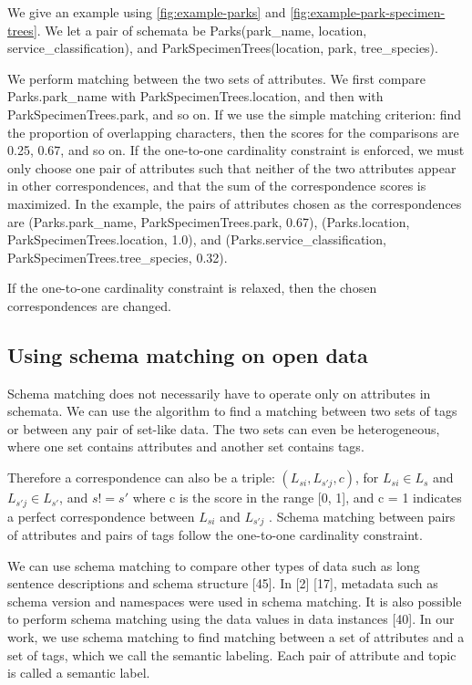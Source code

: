 We give an example using \autoref{fig:example-parks} and \autoref{fig:example-park-specimen-trees}. We let a pair of schemata be
Parks(park\_name, location, service\_classification), and
ParkSpecimenTrees(location, park, tree\_species).

We perform matching between the two sets of attributes. We first compare Parks.park\_name with ParkSpecimenTrees.location, and then with ParkSpecimenTrees.park, and so on. If we use the simple matching criterion: find the proportion of overlapping characters, then the scores for the comparisons are 0.25, 0.67, and so on. If the one-to-one cardinality constraint is enforced, we must only choose one pair of attributes such that neither of the two attributes appear in other correspondences, and that the sum of the correspondence scores is maximized. In the example, the pairs of attributes chosen as the correspondences are
(Parks.park\_name, ParkSpecimenTrees.park, 0.67),
(Parks.location, ParkSpecimenTrees.location, 1.0), and
(Parks.service\_classification, ParkSpecimenTrees.tree\_species, 0.32).

If the one-to-one cardinality constraint is relaxed, then the chosen correspondences are changed.

\subsection{Using schema matching on open data}
\label{ssec:UsingSchemaMatchingOnOpenData}

Schema matching does not necessarily have to operate only on attributes in schemata. We can use the algorithm to find a matching between two sets of tags or between any pair of set-like data. The two sets can even be heterogeneous, where one set contains attributes and another set contains tags.

Therefore a correspondence can also be a triple:
$(L_{si},L_{s'j},c)$, for $L_{si}\in L_{s}$ and $L_{s'j}\in L_{s'}$, and $s!=s'$
where c is the score in the range [0, 1], and c = 1 indicates a perfect correspondence between $L_{si}$ and $L_{s'j}$ . Schema matching between pairs of attributes and pairs of tags follow the one-to-one cardinality constraint.

We can use schema matching to compare other types of data such as long sentence descriptions and schema structure \cite{Sorrentino2011NORMS}[45]. In \cite{10.1145/1066157.1066283}[2] \cite{Duchateau2009YAM}[17], metadata such as schema version and namespaces were used in schema matching. It is also possible to perform schema matching using the data values in data instances \cite{Rahm2001Survey}[40]. In our work, we use schema matching to find matching between a set of attributes and a set of tags, which we call the semantic labeling. Each pair of attribute and topic is called a semantic label.

